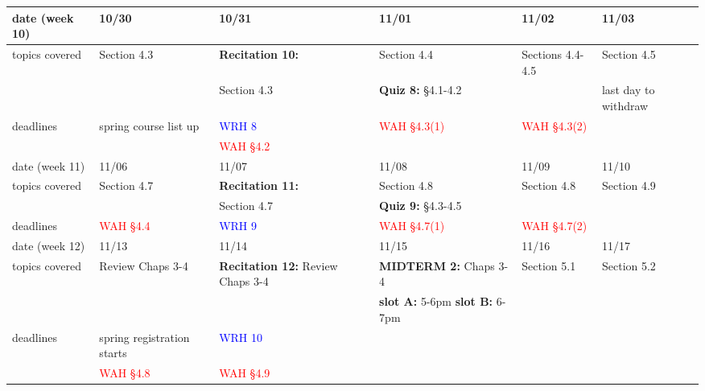 \documentclass[11pt,fleqn]{article}
\begin{document}
\begin{tabularx}{\textwidth}{|X|| X | X | X | X | X |}
\rowcolor{gray!20}
date (week 10)&10/30&10/31&11/01&11/02&11/03\\ \hline
topics covered&Section 4.3&\textbf{Recitation 10:}&Section 4.4&Sections 4.4-4.5&Section 4.5\\ 
&&Section 4.3&\textbf{Quiz 8:} \S4.1-4.2&&\textcolor{ddgreen}{last day to withdraw}\\ \hline
deadlines&\textcolor{ddgreen}{spring course list up}&\textcolor{blue}{WRH 8} &\textcolor{red}{WAH \S 4.3(1)}&\textcolor{red}{WAH \S 4.3(2)}& \\
&&\textcolor{red}{WAH \S 4.2}&&& \\ \hline \hline
\rowcolor{gray!20}
date (week 11)&11/06&11/07&11/08&11/09&11/10\\ \hline
topics covered&Section 4.7&\textbf{Recitation 11:}&Section 4.8&Section 4.8&Section 4.9\\ 
&&Section 4.7&\textbf{Quiz 9:} \S4.3-4.5&&\\ \hline
deadlines&\textcolor{red}{WAH \S 4.4}&\textcolor{blue}{WRH 9} &\textcolor{red}{WAH \S 4.7(1)}&\textcolor{red}{WAH \S 4.7(2)}& \\ \hline \hline
\rowcolor{gray!20}
date (week 12)&11/13&11/14&11/15&11/16&11/17\\ \hline
topics covered&Review Chaps 3-4&\textbf{Recitation 12:} Review Chaps 3-4&\textcolor{dcyan}{\textbf{MIDTERM 2: }} Chaps 3-4&Section 5.1&Section 5.2\\ 
&&&\textcolor{ddgreen}{\textbf{slot A:} 5-6pm  \textbf{slot B:} 6-7pm}&&\\ \hline
deadlines&\textcolor{ddgreen}{spring registration starts}&\textcolor{blue}{WRH 10} &&& \\ 
&\textcolor{red}{WAH \S 4.8}&\textcolor{red}{WAH \S 4.9}&&& \\ \hline \hline
\end{tabularx}
\end{document}
